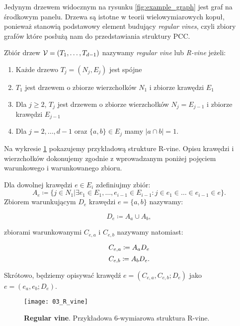 Jedynym drzewem widocznym na rysunku \ref{fig:example_graph} jest graf na środkowym panelu. Drzewa są istotne w teorii wielowymiarowych kopuł, ponieważ stanowią podstawowy element budujący \emph{regular vines}, czyli zbiory grafów które posłużą nam do przedstawiania struktury PCC.

\begin{df}
	Zbiór drzew $\mathcal{V} = (T_1,\dots, T_{d-1})$ nazywamy \emph{regular vine} lub \emph{R-vine} jeżeli:
	
	\begin{enumerate}
		\item Każde drzewo $T_j=(N_j, E_j)$ jest spójne
		\item $T_1$ jest drzewem o zbiorze wierzchołków $N_1$ i zbiorze krawędzi $E_1$
		\item Dla $j\geqslant2$, $T_j$ jest drzewem o zbiorze wierzchołków $N_j = E_{j-1}$ i zbiorze krawędzi $E_{j-1}$
		\item Dla $j = 2, \dots, d- 1$ oraz $\{a, b\} \in E_j$ mamy $ \vert a \cap b \vert = 1$. 
	\end{enumerate}
\end{df}

Na wykresie \ref{fig:r_vine} pokazujemy przykładową strukture R-vine. Opisu krawędzi i wierzchołków dokonujemy zgodnie z wprowadzanym poniżej pojęciem warunkowego i warunkowanego zbioru.

\begin{df}
	Dla dowolnej krawędzi $e\in E_i$ zdefiniujmy zbiór:
	$$ A_e\coloneqq \{j\in N_1\vert \exists e_1 \in E_1, \dots, e_{i-1}\in E_{i-1}: j\in e_1\in \dots \in e_{i-1}\in e\}.$$
	Zbiorem warunkującym $D_e$ krawędzi $e=\{a, b\}$ nazywamy:
	
	$$ D_e \coloneqq A_a \cup A_b,$$
	
	zbiorami warunkowanymi $C_{e, a}$ i $C_{e, b}$ nazywamy natomiast:
	
	$$ C_{e, a} \coloneqq A_a\\ D_e$$
	$$ C_{e, b} \coloneqq A_b\\ D_e.$$
	
	Skrótowo, będziemy opisywać krawędź $e = (C_{e, a}, C_{e, b}; D_e)$ jako $e = (e_a, e_b; D_e)$.
\end{df}


\begin{figure}[h]
	\centering
	\texttt{[image: 03\_R\_vine]}
	
	\caption{\textbf{Regular vine}. Przykładowa 6-wymiarowa struktura R-vine. \label{fig:r_vine}}
\end{figure}

